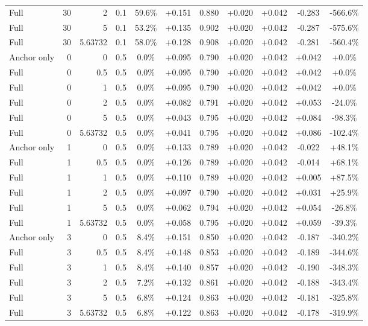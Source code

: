 \begin{table}[htbp]
\begin{tabular}{lrrrccccccc}
Full & 30 & 2 & 0.1 & 59.6\% & +0.151 & 0.880 & +0.020 & +0.042 & -0.283 & -566.6\% \\
Full & 30 & 5 & 0.1 & 53.2\% & +0.135 & 0.902 & +0.020 & +0.042 & -0.287 & -575.6\% \\
Full & 30 & 5.63732 & 0.1 & 58.0\% & +0.128 & 0.908 & +0.020 & +0.042 & -0.281 & -560.4\% \\
Anchor only & 0 & 0 & 0.5 & 0.0\% & +0.095 & 0.790 & +0.020 & +0.042 & +0.042 & +0.0\% \\
Full & 0 & 0.5 & 0.5 & 0.0\% & +0.095 & 0.790 & +0.020 & +0.042 & +0.042 & +0.0\% \\
Full & 0 & 1 & 0.5 & 0.0\% & +0.095 & 0.790 & +0.020 & +0.042 & +0.042 & +0.0\% \\
Full & 0 & 2 & 0.5 & 0.0\% & +0.082 & 0.791 & +0.020 & +0.042 & +0.053 & -24.0\% \\
Full & 0 & 5 & 0.5 & 0.0\% & +0.043 & 0.795 & +0.020 & +0.042 & +0.084 & -98.3\% \\
Full & 0 & 5.63732 & 0.5 & 0.0\% & +0.041 & 0.795 & +0.020 & +0.042 & +0.086 & -102.4\% \\
Anchor only & 1 & 0 & 0.5 & 0.0\% & +0.133 & 0.789 & +0.020 & +0.042 & -0.022 & +48.1\% \\
Full & 1 & 0.5 & 0.5 & 0.0\% & +0.126 & 0.789 & +0.020 & +0.042 & -0.014 & +68.1\% \\
Full & 1 & 1 & 0.5 & 0.0\% & +0.110 & 0.789 & +0.020 & +0.042 & +0.005 & +87.5\% \\
Full & 1 & 2 & 0.5 & 0.0\% & +0.097 & 0.790 & +0.020 & +0.042 & +0.031 & +25.9\% \\
Full & 1 & 5 & 0.5 & 0.0\% & +0.062 & 0.794 & +0.020 & +0.042 & +0.054 & -26.8\% \\
Full & 1 & 5.63732 & 0.5 & 0.0\% & +0.058 & 0.795 & +0.020 & +0.042 & +0.059 & -39.3\% \\
Anchor only & 3 & 0 & 0.5 & 8.4\% & +0.151 & 0.850 & +0.020 & +0.042 & -0.187 & -340.2\% \\
Full & 3 & 0.5 & 0.5 & 8.4\% & +0.148 & 0.853 & +0.020 & +0.042 & -0.189 & -344.6\% \\
Full & 3 & 1 & 0.5 & 8.4\% & +0.140 & 0.857 & +0.020 & +0.042 & -0.190 & -348.3\% \\
Full & 3 & 2 & 0.5 & 7.2\% & +0.132 & 0.861 & +0.020 & +0.042 & -0.188 & -343.4\% \\
Full & 3 & 5 & 0.5 & 6.8\% & +0.124 & 0.863 & +0.020 & +0.042 & -0.181 & -325.8\% \\
Full & 3 & 5.63732 & 0.5 & 6.8\% & +0.122 & 0.863 & +0.020 & +0.042 & -0.178 & -319.9\% \\

\end{tabular}
\end{table}
